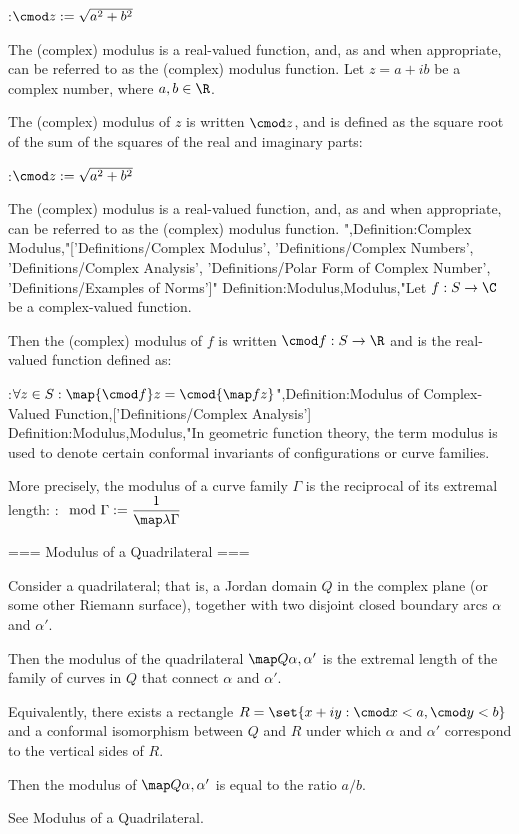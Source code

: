 :$\cmod z := \sqrt {a^2 + b^2}$


The (complex) modulus is a real-valued function, and, as and when appropriate, can be referred to as the (complex) modulus function.
Let $z = a + i b$ be a complex number, where $a, b \in \R$.


The (complex) modulus of $z$ is written $\cmod z$, and is defined as the square root of the sum of the squares of the real and imaginary parts:

:$\cmod z := \sqrt {a^2 + b^2}$


The (complex) modulus is a real-valued function, and, as and when appropriate, can be referred to as the (complex) modulus function.
",Definition:Complex Modulus,"['Definitions/Complex Modulus', 'Definitions/Complex Numbers', 'Definitions/Complex Analysis', 'Definitions/Polar Form of Complex Number', 'Definitions/Examples of Norms']"
Definition:Modulus,Modulus,"Let $f: S \to \C$ be a complex-valued function.


Then the (complex) modulus of $f$ is written $\cmod f : S \to \R$ and is the real-valued function defined as:

:$\forall z \in S: \map {\cmod f} z = \cmod {\map f z}$",Definition:Modulus of Complex-Valued Function,['Definitions/Complex Analysis']
Definition:Modulus,Modulus,"In geometric function theory, the term modulus is used to denote certain conformal invariants of configurations or curve families.

More precisely, the modulus of a curve family $\Gamma$ is the reciprocal of its extremal length:
:$\mod \Gamma := \dfrac 1 {\map \lambda \Gamma}$


=== Modulus of a Quadrilateral ===

Consider a quadrilateral; that is, a Jordan domain $Q$ in the complex plane (or some other Riemann surface), together with two disjoint closed boundary arcs $\alpha$ and $\alpha'$.

Then the modulus of the quadrilateral $\map Q {\alpha, \alpha'}$ is the extremal length of the family of curves in $Q$ that connect $\alpha$ and $\alpha'$.

Equivalently, there exists a rectangle $R = \set {x + i y: \cmod x < a, \cmod y < b}$ and a conformal isomorphism between $Q$ and $R$ under which $\alpha$ and $\alpha'$ correspond to the vertical sides of $R$.

Then the modulus of $\map Q {\alpha, \alpha'}$ is equal to the ratio $a/b$.


See Modulus of a Quadrilateral.


